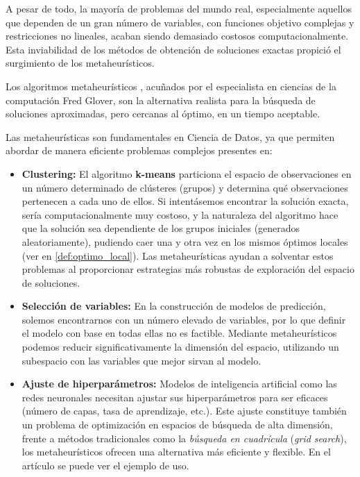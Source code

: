 \documentclass[12pt,a4paper]{book}
\begin{document}
A pesar de todo, la mayoría de problemas del mundo real, especialmente aquellos que dependen de un gran número de variables, con funciones objetivo complejas y restricciones no lineales, acaban siendo demasiado costosos computacionalmente. Esta inviabilidad de los métodos de obtención de soluciones exactas propició el surgimiento de los metaheurísticos.

Los algoritmos metaheurísticos \citep{metaheuristicos}, acuñados por el especialista en ciencias de la computación Fred Glover,
son la alternativa realista para la búsqueda de soluciones aproximadas, pero cercanas al óptimo, en un tiempo aceptable.

Las metaheurísticas son fundamentales en Ciencia de Datos, ya que permiten abordar de manera eficiente problemas complejos presentes en:

\begin{itemize}
    \item \textbf{Clustering:} El algoritmo \textbf{k-means} \citep{k-means} particiona el espacio de observaciones en un número determinado de clústeres (grupos) y determina qué observaciones pertenecen a cada uno de ellos. 
    Si intentásemos encontrar la solución exacta, sería computacionalmente muy costoso, y la naturaleza del algoritmo hace que la solución sea dependiente de los grupos iniciales (generados aleatoriamente), pudiendo caer una y otra vez en los mismos óptimos locales (ver en \ref{def:optimo_local}).
    Las metaheurísticas ayudan a solventar estos problemas al proporcionar estrategias más robustas de exploración del espacio de soluciones.
    
    \item \textbf{Selección de variables:} En la construcción de modelos de predicción, solemos encontrarnos con un número elevado de variables, por lo que definir el modelo con base en todas ellas no es factible. Mediante metaheurísticos podemos 
    reducir significativamente la dimensión del espacio, utilizando un subespacio con las variables que mejor sirvan al modelo.
    
    \item \textbf{Ajuste de hiperparámetros:} Modelos de inteligencia artificial como las redes neuronales necesitan ajustar sus hiperparámetros para ser eficaces (número de capas, tasa de aprendizaje, etc.). Este ajuste constituye también un problema de optimización en espacios de búsqueda de alta dimensión, frente a métodos tradicionales como la \textit{búsqueda en cuadrícula} (\textit{grid search}), los metaheurísticos ofrecen una alternativa más eficiente y flexible. En el artículo \cite{hyperparameters} se puede ver el ejemplo de uso.
\end{itemize}
\end{document}
